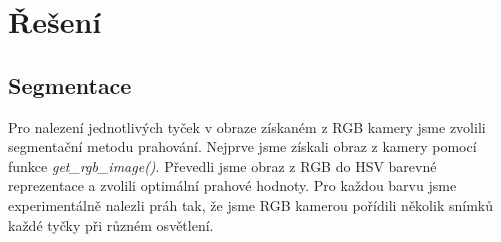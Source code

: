 \documentclass{article}
\begin{document}
	

	
	
	
	
\newpage

\section{Řešení}

\subsection{Segmentace}
	
	Pro nalezení jednotlivých tyček v obraze získaném z RGB kamery jsme zvolili segmentační metodu prahování. Nejprve jsme získali obraz z kamery pomocí funkce {\it get\_rgb\_image()}. Převedli jsme obraz z RGB do HSV barevné reprezentace a zvolili optimální prahové hodnoty. Pro každou barvu jsme experimentálně nalezli práh tak, že jsme RGB kamerou pořídili několik snímků každé tyčky při různém osvětlení. 

\vspace{0.5cm}
\end{document}
